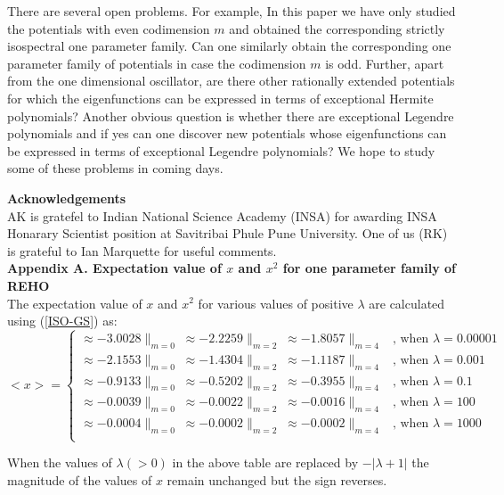 \documentclass[11pt]{article}
\begin{document}
There are several open problems. For example, In this paper we have only 
studied the
potentials with even codimension $m$ and obtained the corresponding strictly 
isospectral one parameter family. Can one similarly obtain the corresponding
one parameter family of potentials in case the codimension $m$ is odd. Further,
apart from the one dimensional
oscillator, are there other rationally extended potentials for which the
eigenfunctions can be expressed in terms of exceptional Hermite polynomials? 
Another obvious question is whether there are exceptional Legendre polynomials
and if yes can one discover new  potentials whose eigenfunctions can be 
expressed in terms of exceptional Legendre polynomials? We hope to study some
of these problems in coming days.

{\bf Acknowledgements}\\
AK is gratefel to Indian National Science Academy (INSA) for awarding INSA 
Honarary Scientist position at Savitribai Phule Pune University. One of us (RK) is grateful to Ian Marquette for useful comments.\\

{\bf Appendix A. Expectation value of \( x \) and \( x^2 \) for one parameter 
family of REHO} \\
The expectation value of \( x \) and \( x^2 \) for various values of positive \( \lambda \) are calculated using (\ref{ISO-GS}) as:
\begin{equation*}
<x> =
\begin{cases}
\approx -3.0028\|_{m=0}\;\approx -2.2259\|_{m=2}\;\approx -1.8057\|_{m=4}&\text{, when $\lambda=0.00001$}\\
\approx -2.1553\|_{m=0}\;\approx -1.4304\|_{m=2}\;\approx -1.1187\|_{m=4}&\text{, when $\lambda=0.001$}\\
\approx -0.9133\|_{m=0}\;\approx -0.5202\|_{m=2}\;\approx -0.3955\|_{m=4}&\text{, when $\lambda=0.1$}\\
\approx -0.0039\|_{m=0}\;\approx -0.0022\|_{m=2}\;\approx -0.0016\|_{m=4}&\text{, when $\lambda=100$}\\
\approx -0.0004\|_{m=0}\;\approx -0.0002\|_{m=2}\;\approx -0.0002\|_{m=4}&\text{, when $\lambda=1000$}\\\end{cases}
\end{equation*}

When the values of \( \lambda (>0) \) in the above table are replaced by 
\( -|\lambda+1| \) the magnitude of the values of \( x \) remain unchanged but 
the sign reverses.
\end{document}
